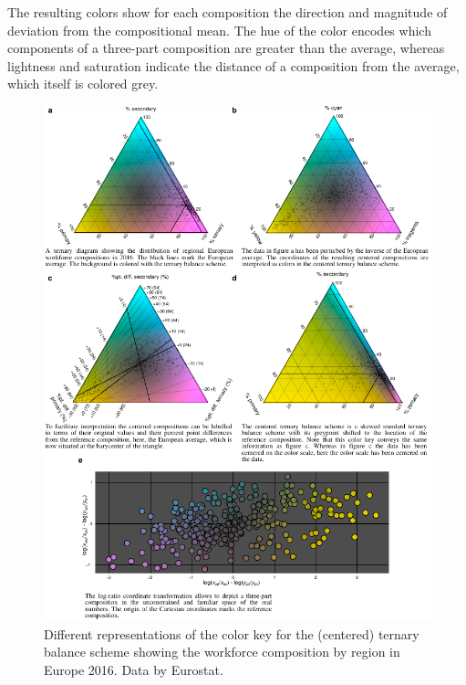 \documentclass[10pt, twoside, parskip=half]{article}
\makeatletter
\def\maxwidth{\ifdim\Gin@nat@width>\linewidth\linewidth
\else\Gin@nat@width\fi}
\let\Oldincludegraphics\includegraphics
\renewcommand{\includegraphics}[1]{\Oldincludegraphics[width=\maxwidth]{#1}}
\makeatother
\begin{document}
The resulting colors show for each composition the direction and
magnitude of deviation from the compositional mean. The hue of the color
encodes which components of a three-part composition are greater than
the average, whereas lightness and saturation indicate the distance of a
composition from the average, which itself is colored grey.

\begin{figure}

{\centering \includegraphics{figure3} 

}

\caption{Different representations of the color key for the (centered) ternary balance scheme showing the workforce composition by region in Europe 2016. Data by Eurostat.}\label{fig:unnamed-chunk-3}
\end{figure}
\end{document}
